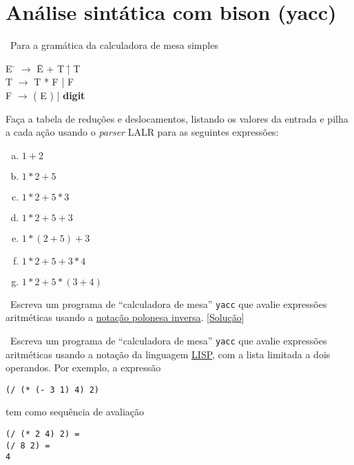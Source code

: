 \section*{Análise sintática com bison (yacc)}

\newexerc~Para a gramática da calculadora de mesa simples

\begin{tabbing}
  E \= $\rightarrow$ \= E + T \= | T \\
  T \> $\rightarrow$ \> T * F \> | F\\
  F \> $\rightarrow$ \> ( E ) \> | {\bf digit}\\
\end{tabbing}

\noindent Faça a tabela de reduções e deslocamentos, listando os
valores da entrada e pilha a cada ação usando o {\it parser\/} LALR
para as seguintes expressões:

\begin{enumerate}[a.]
\item $1 + 2$
\item $1 * 2 + 5$
\item $1 * 2 + 5 * 3$
\item $1 * 2 + 5 + 3$
\item $1 * (2 + 5) + 3$
\item $1 * 2 + 5 + 3 * 4$
\item $1 * 2 + 5 * (3 + 4)$
\end{enumerate}

\newexerc~Escreva um programa de ``calculadora de mesa'' {\tt yacc} que avalie
expressões aritméticas usando a \href{https://pt.wikipedia.org/wiki/Nota%C3%A7%C3%A3o_polonesa_inversa}{notação polonesa inversa}.
  [\href{https://github.com/aholanda/edu-compiladores/tree/main/bison/03-calc}{Solução}]

\newexerc~Escreva um programa de ``calculadora de mesa'' {\tt yacc}
que avalie expressões aritméticas usando a notação da linguagem
\href{https://pt.wikipedia.org/wiki/Lisp}{LISP}, com a lista limitada
a dois operandos. Por exemplo, a expressão

\begin{center}
\begin{verbatim}
(/ (* (- 3 1) 4) 2)
\end{verbatim}
\end{center}

\noindent tem como sequência de avaliação

\begin{center}
\begin{verbatim}
(/ (* 2 4) 2) =
(/ 8 2) =
4
\end{verbatim}
\end{center}

